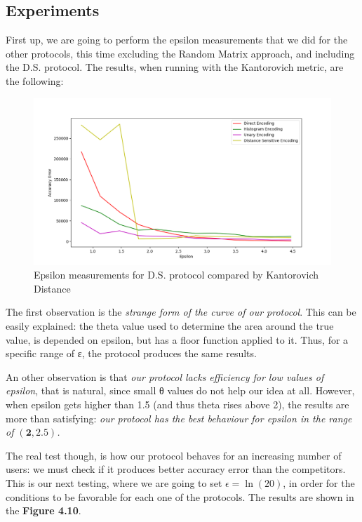 \subsection{Experiments}
First up, we are going to perform the epsilon measurements that we did for the other protocols, this time excluding the Random Matrix approach, and including the D.S. protocol. The results, when running with the Kantorovich metric, are the following:

\begin{figure}[!htb]\centering
    \includegraphics[width=1\textwidth]{images/epsilon_our_kant.png}
    \caption{Epsilon measurements for D.S. protocol compared by Kantorovich Distance}
\end{figure}

The first observation is the \emph{strange form of the curve of our protocol}. This can be easily explained: the theta value used to determine the area around the true value, is depended on epsilon, but has a floor function applied to it. Thus, for a specific range of ε, the protocol produces the same results. 

An other observation is that\emph{ our protocol lacks efficiency for low values of epsilon}, that is natural, since small θ values do not help our idea at all. However, when epsilon gets higher than 1.5 (and thus theta rises above 2), the results are more than satisfying: \emph{our protocol has the best behaviour for epsilon in the range of $\mathbf{(2, 2.5)}$.}

The real test though, is how our protocol behaves for an increasing number of users: we must check if it produces better accuracy error than the competitors. This is our next testing, where we are going to set $\epsilon = \ln(20)$, in order for the conditions to be favorable for each one of the protocols. The results are shown in the \textbf{Figure 4.10}.


